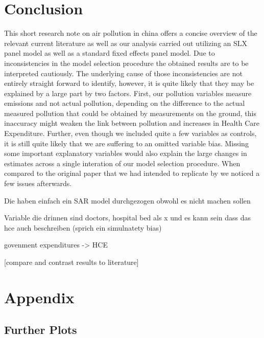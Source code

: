 \documentclass[
]{article}
\begin{document}
	\section{Conclusion} \label{Conclusion}
	
	This short research note on air pollution in china offers a concise overview of the relevant current literature as well as our analysis carried out utilizing an SLX panel model as well as a standard fixed effects panel model. Due to inconsistencies in the model selection procedure the obtained results are to be interpreted cautiously. The underlying cause of those inconsistencies are not entirely straight forward to identify, however, it is quite likely that they may be explained by a large part by two factors. First, our pollution variables measure emissions and not actual pollution, depending on the difference to the actual measured pollution that could be obtained by measurements on the ground, this inaccuracy might weaken the link between pollution and increases in Health Care Expenditure. Further, even though we included quite a few 
	variables as controls, it is still quite likely that we are suffering to an omitted variable bias. Missing some important explanatory variables would also explain the large changes in estimates across a single interation of our model selection procedure. 
	When compared to the original paper that we had intended to replicate by \cite{zeng2019does} we noticed a few issues afterwards. 
	
	Die haben einfach ein SAR model durchgezogen obwohl es nicht machen sollen 
	
	Variable die drinnen sind doctors, hospital bed als x und es kann sein dass das hce auch beschreiben (sprich ein simulnatety bias)
	
	govenment expenditures -> HCE 
	
	
	
	[compare and contrast results to literature]
	
	

	\newpage
	\printbibliography[heading=bibintoc]
	\newpage
	\appendix
	\section{Appendix}
	\subsection{Further Plots}
\end{document}
